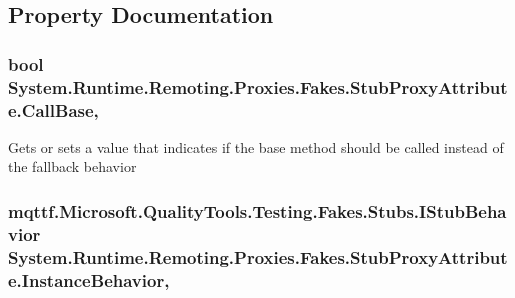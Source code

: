 \subsection{Property Documentation}
\hypertarget{class_system_1_1_runtime_1_1_remoting_1_1_proxies_1_1_fakes_1_1_stub_proxy_attribute_ab175d7bab9bef5f42c6816f8840c8e2e}{
\subsubsection[{Call\-Base}]{\setlength{\rightskip}{0pt plus 5cm}bool System.\-Runtime.\-Remoting.\-Proxies.\-Fakes.\-Stub\-Proxy\-Attribute.\-Call\-Base\hspace{0.3cm}{\ttfamily [get]}, {\ttfamily [set]}}}\label{class_system_1_1_runtime_1_1_remoting_1_1_proxies_1_1_fakes_1_1_stub_proxy_attribute_ab175d7bab9bef5f42c6816f8840c8e2e}


Gets or sets a value that indicates if the base method should be called instead of the fallback behavior

\hypertarget{class_system_1_1_runtime_1_1_remoting_1_1_proxies_1_1_fakes_1_1_stub_proxy_attribute_a7bea74e9b63b508fbd51cfb9b9662aaf}{
\subsubsection[{Instance\-Behavior}]{\setlength{\rightskip}{0pt plus 5cm}mqttf.\-Microsoft.\-Quality\-Tools.\-Testing.\-Fakes.\-Stubs.\-I\-Stub\-Behavior System.\-Runtime.\-Remoting.\-Proxies.\-Fakes.\-Stub\-Proxy\-Attribute.\-Instance\-Behavior\hspace{0.3cm}{\ttfamily [get]}, {\ttfamily [set]}}}\label{class_system_1_1_runtime_1_1_remoting_1_1_proxies_1_1_fakes_1_1_stub_proxy_attribute_a7bea74e9b63b508fbd51cfb9b9662aaf}


